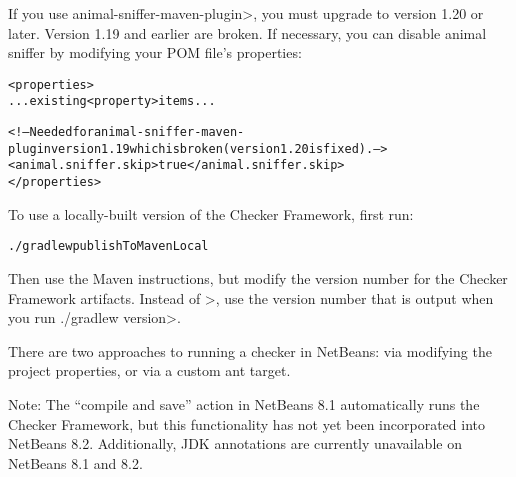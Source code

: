 If you use \<animal-sniffer-maven-plugin>, you must upgrade to version 1.20
or later.  Version 1.19 and earlier are broken.  If necessary, you can
disable animal sniffer by modifying your POM file's properties:

\begin{mysmall}
\begin{alltt}
  <properties>
    ... existing <property> items ...

    <!-- Needed for animal-sniffer-maven-plugin version 1.19 which is broken (version 1.20 is fixed). -->
    <animal.sniffer.skip>true</animal.sniffer.skip>
  </properties>
\end{alltt}
\end{mysmall}


To use a locally-built version of the Checker Framework, first run:

\begin{alltt}
./gradlew publishToMavenLocal
\end{alltt}

\noindent
Then use the Maven instructions, but modify the version number for the
Checker Framework artifacts.  Instead of \<\ReleaseVersion{}>, use the
version number that is output when you run \<./gradlew version>.



There are two approaches to running a checker in NetBeans:  via modifying the
project properties, or via a custom ant target.

Note: The ``compile and save'' action in NetBeans 8.1 automatically
runs the Checker Framework, but this functionality has not yet
been incorporated into NetBeans 8.2. Additionally, JDK annotations
are currently unavailable on NetBeans 8.1 and 8.2.




